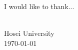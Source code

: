 \begin{dedication}
\setcounter{page}{2}
\addchaptertocentry{\dedicationname} %
\vspace{1cm}


\noindent I would like to thank...
\\[0.4cm]

\begin{flushright}
    \authorname \\
    Hosei University \\
    \usdate\today
\end{flushright}

\end{dedication}